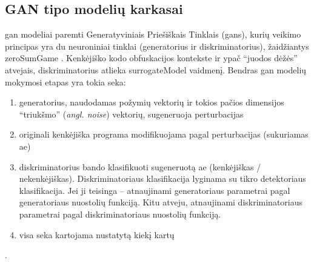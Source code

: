 \subsection{GAN tipo modelių karkasai}\label{sec:literature:gan}

\ac{gan} modeliai paremti Generatyviniais Priešiškais Tinklais (\aclp{gan}), kurių veikimo principas yra du neuroniniai tinklai (generatorius ir diskriminatorius), žaidžiantys \gls{zeroSumGame} \citeplace. Kenkėjiško kodo obfuskacijos kontekste ir ypač \enquote{juodos dėžės} atvejais, diskriminatorius atlieka \gls{surrogateModel} vaidmenį. Bendras \ac{gan} modelių mokymosi etapas yra tokia seka:
\begin{enumerate}
    \item generatorius, naudodamas požymių vektorių ir tokios pačios dimensijos \enquote{triukšmo} (\textit{angl. noise}) vektorių, sugeneruoja perturbacijas
    \item originali kenkėjiška programa modifikuojama pagal perturbacijas (sukuriamas \ac{ae})
    \item diskriminatorius bando klasifikuoti sugeneruotą \ac{ae} (kenkėjiškas / nekenkėjiškas). Diskriminatoriaus klasifikacija lyginama su tikro detektoriaus klasifikacija. Jei ji teisinga -- atnaujinami generatoriaus parametrai pagal generatoriaus nuostolių funkciją. Kitu atveju, atnaujinami diskriminatoriaus parametrai pagal diskriminatoriaus nuostolių funkciją.
    \item visa seka kartojama nustatytą kiekį kartų
\end{enumerate} \citeplace.